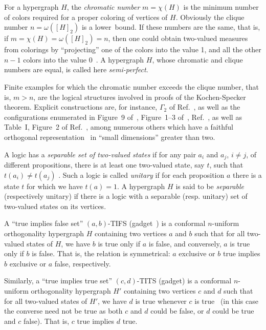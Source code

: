 \documentclass[%
12pt,
prereprint,
showpacs,
showkeys,
preprintnumbers,
amsmath,amssymb,
aps,
pra,
longbibliography,
notitlepage
]{revtex4-1}
\theoremstyle{definition}
\begin{document}
        For a hypergraph $H$, the \emph{chromatic number} $m=\chi(H)$ is the minimum number of colors required for a proper coloring of vertices of $H$. Obviously the clique number $n=\omega([H]_2 )$ is a lower~bound. If these numbers are the same, that is, if $m=\chi(H)=\omega([H]_2 )=n$, then one could obtain two-valued measures from colorings by ``projecting'' one of the colors into the value 1, and all the other $n-1$ colors into the value 0~\cite{godsil-zaks,meyer:99,havlicek-2000}. A hypergraph $H$, whose chromatic and clique numbers are equal, is called here \emph{semi-perfect}.


        Finite examples for which the chromatic number exceeds the clique number, that is, $m>n$,
        are the logical structures involved in proofs of the Kochen-Specker theorem.
        Explicit constructions are, for instance,
        $\Gamma_2$ of Ref.~\cite{kochen1},
        as well as the configurations enumerated in
        Figure~9 of~\cite{svozil-tkadlec},
        Figure~1--3 of~\cite{tkadlec-00},
        Ref.~\cite{cabello-96},
        as well as Table~I, Figure~2 of Ref.~\cite{2015-AnalyticKS},
        among numerous others
        which have a faithful orthogonal representation~\cite{lovasz-79,lovasz-89,Portillo-2015}
        in ``small dimensions'' greater than two.

        A logic has a \emph{separable set of two-valued states} if for any pair $a_i$ and $a_j$, $i\neq j$, of different propositions, there is at least one two-valued state, say $t$, such that $t( a_i ) \neq t(a_j )$ \cite{svozil-tkadlec}. Such a logic is called \emph{unitary} if for each proposition $a$ there is a state $t$ for which we have $t(a)=1$. A hypergraph $H$ is said to be \emph{separable} (respectively unitary) if there is a logic with a separable (resp. unitary) set of two-valued states on its vertices. %

        A ``true implies false set'' $(a,b)$-TIFS (gadget~\cite{tutte_1954,SZABO2009436,Ramanathan-18}) is a conformal $n$-uniform orthogonality hypergraph $H$ containing two vertices $a$ and $b$ such that for all two-valued states of $H$, we have $b$ is true only if $a$ is false, and conversely, $a$ is true only if $b$ is false. That is, the relation is symmetrical: $a$ exclusive or  $b$ true implies $b$ exclusive or $a$ false, respectively.

        Similarly, a ``true implies true set'' $(c,d)$-TITS (gadget) is a conformal $n$-uniform orthogonality hypergraph $H'$ containing two vertices $c$ and $d$ such that for all two-valued states of $H'$, we have $d$ is true whenever $c$ is true~\cite{2018-minimalYIYS}
        (in this case the converse need not be true as both $c$ and $d$ could be false, or $d$ could be true and $c$ false). That is, $c$ true implies $d$ true.
\end{document}
